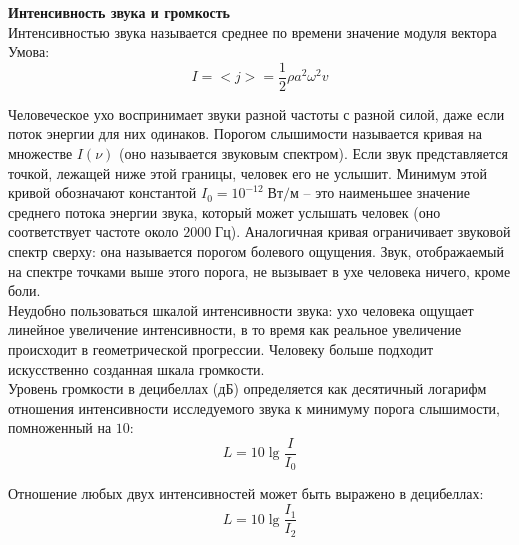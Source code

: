\documentclass{article}
\begin{document}
	
	\textbf{Интенсивность звука и громкость}\\

	Интенсивностью звука называется среднее по времени значение модуля вектора Умова:
	\begin{equation}
		I = <j> = \frac{1}{2}\rho a^2\omega^2v
	\end{equation}

	Человеческое ухо воспринимает звуки разной частоты с разной силой, даже если поток энергии для них одинаков. Порогом слышимости называется кривая на множестве $I(\nu)$ (оно называется звуковым спектром). Если звук представляется точкой, лежащей ниже этой границы, человек его не услышит. Минимум этой кривой обозначают константой $I_0=10^{-12}\;\text{Вт}/\text{м}$ -- это наименьшее значение среднего потока энергии звука, который может услышать человек (оно соответствует частоте около $2000\;\text{Гц}$). Аналогичная кривая ограничивает звуковой спектр сверху: она называется порогом болевого ощущения. Звук, отображаемый на спектре точками выше этого порога, не вызывает в ухе человека ничего, кроме боли.\\

	Неудобно пользоваться шкалой интенсивности звука: ухо человека ощущает линейное увеличение интенсивности, в то время как реальное увеличение происходит в геометрической прогрессии. Человеку больше подходит искусственно созданная шкала громкости. \\

	Уровень громкости в децибеллах (дБ) определяется как десятичный логарифм отношения интенсивности исследуемого звука к минимуму порога слышимости, помноженный на $10$:
	\begin{equation}
		L = 10\lg\frac{I}{I_0}
	\end{equation}

	Отношение любых двух интенсивностей может быть выражено в децибеллах:
	\begin{equation}
		L = 10\lg\frac{I_1}{I_2}
	\end{equation}
\end{document}
